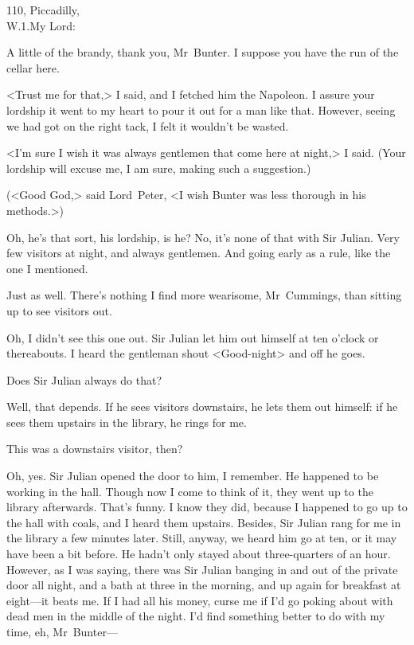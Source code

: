 \begin{mail}{110, Piccadilly,\\W\@.1.}{My Lord:}
\begin{dialogue}
 A little of the brandy, thank you, Mr~Bunter. I suppose you have the run of the cellar here. 
\end{dialogue}

<Trust me for that,> I said, and I fetched him the Napoleon. I assure your lordship it went to my heart to pour it out for a man like that. However, seeing we had got on the right tack, I felt it wouldn't be wasted.

<I'm sure I wish it was always gentlemen that come here at night,> I said. (Your lordship will excuse me, I am sure, making such a suggestion.)

\pausemail
(<Good God,> said Lord~Peter, <I wish Bunter was less thorough in his methods.>)
\resumemail

\begin{dialogue}
 Oh, he's that sort, his lordship, is he?  No, it's none of that with Sir Julian. Very few visitors at night, and always gentlemen. And going early as a rule, like the one I mentioned.

 Just as well. There's nothing I find more wearisome, Mr~Cummings, than sitting up to see visitors out.

 Oh, I didn't see this one out. Sir Julian let him out himself at ten o'clock or thereabouts. I heard the gentleman shout <Good-night> and off he goes.

 Does Sir Julian always do that?

 Well, that depends. If he sees visitors downstairs, he lets them out himself: if he sees them upstairs in the library, he rings for me.

 This was a downstairs visitor, then?

 Oh, yes. Sir Julian opened the door to him, I remember. He happened to be working in the hall. Though now I come to think of it, they went up to the library afterwards. That's funny. I know they did, because I happened to go up to the hall with coals, and I heard them upstairs. Besides, Sir Julian rang for me in the library a few minutes later. Still, anyway, we heard him go at ten, or it may have been a bit before. He hadn't only stayed about three-quarters of an hour. However, as I was saying, there was Sir Julian banging in and out of the private door all night, and a bath at three in the morning, and up again for breakfast at eight—it beats me. If I had all his money, curse me if I'd go poking about with dead men in the middle of the night. I'd find something better to do with my time, eh, Mr~Bunter—


\end{dialogue}
\end{mail}

